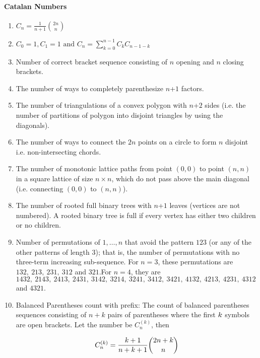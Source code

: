 \paragraph{Catalan Numbers}\begin{enumerate}

            
            \item $\displaystyle C_n=\frac{1}{n+1}{2n \choose n}$
            \item $\displaystyle C_0=1,C_1=1\text{ and }C_n=\sum \limits_{k=0}^{n-1}C_k C_{n-1-k}$
            \item Number of correct bracket sequence consisting of $n$ opening and $n$ closing brackets.
            \item The number of ways to completely parenthesize $n$+$\displaystyle 1$ factors.
            \item The number of triangulations of a convex polygon with $n$+$\displaystyle 2$ sides (i.e. the number of
                partitions
                of polygon into disjoint triangles by using the diagonals).
            \item The number of ways to connect the $\displaystyle 2n$ points on a circle to form $n$ disjoint i.e.
                non-intersecting chords.
            \item The number of monotonic lattice paths from point $\displaystyle (0,0)$ to point $\displaystyle (n,n)$ in
                a
                square lattice of size $n\times n$, which do not pass above the main diagonal (i.e. connecting
                $\displaystyle
                (0,0)$ to $\displaystyle (n,n)$).
            \item The number of rooted full binary trees with $n$+$\displaystyle 1$ leaves (vertices are not numbered). A
                rooted
                binary tree is full if every vertex has either two children or no children.
            \item Number of permutations of $\displaystyle {1, …, n}$ that avoid the pattern $\displaystyle 123$ (or any
                of
                the
                other patterns of length $3$); that is, the number of permutations with no three-term increasing
                sub-sequence.
                For $n = 3$, these permutations are $\displaystyle 132,\ 213,\ 231,\ 312$ and $321.$\displaystyle For $n
                =
                4$,
                they are $\displaystyle 1432,\ 2143,\ 2413,\ 2431,\ 3142,\ 3214,\ 3241,\ 3412,\ 3421,\ 4132,\ 4213,\
                4231,\
                4312$ and $4321.$
            \item 
                Balanced Parentheses count with prefix:
                    The count of balanced parentheses sequences consisting of $n+k$ pairs of parentheses where the first
                    $\displaystyle \displaystyle k$ symbols are open brackets. Let the number be $\displaystyle
                    C_n^{(k)}$,
                    then
                

                \[\displaystyle \displaystyle C_n^{(k)} = \frac{k+1}{n+k+1} \binom{2n+k}{n}\]
                \end{enumerate}
